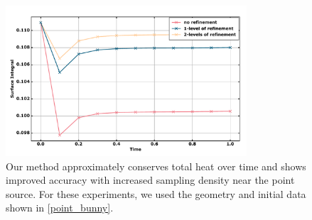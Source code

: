 \documentclass[draft,12pt,openany]{book}
\theoremstyle{plainnormal}
\theoremstyle{remark}
\begin{document}
 \begin{figure}
     \centering
     \includegraphics[width=0.8\textwidth]{Figures/accuracyandheatmass.pdf}
    \caption{Our method approximately conserves total heat over time and shows improved accuracy with increased sampling density near the point source. For these experiments, we used the geometry and initial data shown in \cref{point_bunny}.}
    \label{mass_conservation}
\end{figure}
\FloatBarrier
\end{document}

